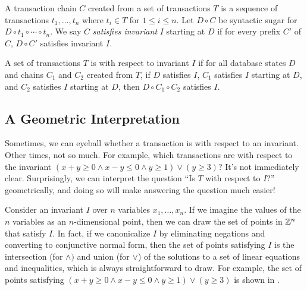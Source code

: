 A transaction chain $C$ created from a set of transactions $T$ is a sequence of
transactions $t_1, \ldots, t_n$ where $t_i \in T$ for $1 \leq i \leq n$. Let $D
\circ C$ be syntactic sugar for $D \circ t_1 \circ \cdots \circ t_n$. We say
$C$ \emph{satisfies invariant} $I$ starting at $D$ if for every prefix $C'$ of
$C$, $D \circ C'$ satisfies invariant $I$.

A set of transactions $T$ is \iconfluent{} with respect to invariant $I$ if for
all database states $D$ and chains $C_1$ and $C_2$ created from $T$, if $D$
satisfies $I$, $C_1$ satisfies $I$ starting at $D$, and $C_2$ satisfies $I$
starting at $D$, then $D \circ C_1 \circ C_2$ satisfies $I$.

\subsection{A Geometric Interpretation}\label{sec:counter-geometry}
\newcommand{\inva}{x + y \geq 0}
\newcommand{\invb}{x - y \leq 0}
\newcommand{\invc}{y \geq 1}
\newcommand{\invd}{y \geq 3}
\newcommand{\inv}{(\inva \land \invb \land \invc) \lor (\invd)}

Sometimes, we can eyeball whether a transaction is \iconfluent{} with respect
to an invariant. Other times, not so much. For example, which transactions are
\iconfluent{} with respect to the invariant $\inv$? It's not immediately
clear.  Surprisingly, we can interpret the question ``Is $T$ \iconfluent{} with
respect to $I$?'' geometrically, and doing so will make answering the question
much easier!

Consider an invariant $I$ over $n$ variables $x_1, \ldots, x_n$. If we imagine
the values of the $n$ variables as an $n$-dimensional point, then we can draw
the set of points in $\mathbb{Z}^n$ that satisfy $I$. In fact, if we canonicalize
$I$ by eliminating negations and converting to conjunctive normal form, then
the set of points satisfying $I$ is the intersection (for $\land)$ and union
(for $\lor$) of the solutions to a set of linear equations and inequalities,
which is always straightforward to draw. For example, the set of points
satisfying $\inv$ is shown in .

